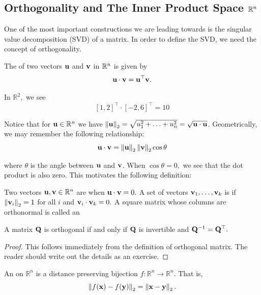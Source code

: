 \subsection{Orthogonality and The Inner Product Space $\R^n$}

One of the most important constructions we are leading towards is the singular value decomposition (SVD) of a matrix. In order to define the SVD, we need the concept of orthogonality.

\begin{definition}
The  of two vectors $\vu$ and $\vv$ in $\R^n$ is given by 
$$\vu \cdot \vv = \vu^\top \vv.$$
\end{definition}

\begin{example}In $\mathbb R^2,$ we see 
$$[1,2]^\top \cdot [-2,6]^\top = 10$$
\end{example}

Notice that for $\vu\in\R^n$ we have
$\norm{\vu}_2 = \sqrt{u_1^2 + \ldots + u_n^2 } = \sqrt{\vu \cdot \vu}$. Geometrically, we may remember the following relationship: 
$$\vu \cdot \vv = \norm{\vu}_2 \norm{\vv}_2 \cos \theta$$

where $\theta$ is the angle between $\vu$ and $\vv$. When $\cos \theta = 0,$ we see that the dot product is also zero. This motivates the following definition: 

\begin{definition}Two vectors $\vu,\vv \in \mathbb R^n$ are  when $\vu \cdot \vv = 0.$
A set of vectors $\vv_1, \ldots, \vv_k$ is  if $\norm{\vv_i}_2 = 1$ for all $i$ and $\vv_i \cdot \vv_k = 0.$
A square matrix whose columns are orthonormal is called an 
\end{definition}

\begin{proposition}
A matrix $\MQ$ is orthogonal if and only if $\MQ$ is invertible and $\MQ^{-1} = \MQ^\top.$
\end{proposition}
\begin{proof}
This follows immediately from the definition of orthogonal matrix. The reader should write out the details as an exercise.
\end{proof}
 
\begin{definition}An  on $\mathbb R^n$ is a distance preserving bijection $f : \mathbb R^n \rightarrow \mathbb R^n$. That is, 
$$\norm{f(\vx) - f(\vy)}_2 = \norm{\vx - \vy}_2.$$
\end{definition}

